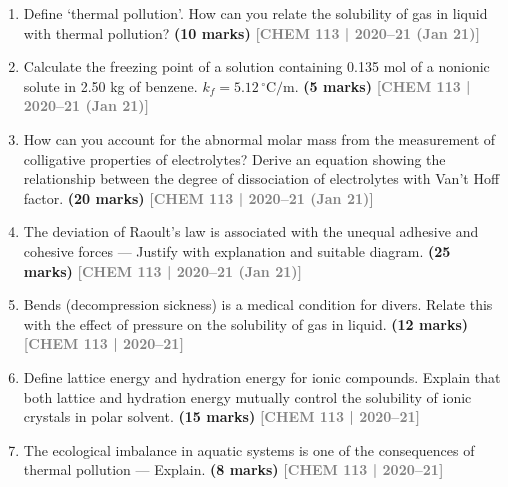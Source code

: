 \documentclass[12pt,a3paper]{article}
\newcommand{\yr}[1]{\hfill\textcolor{gray}{\small\textbf{[#1]}}}
\newcommand{\mk}[1]{\textcolor{orange!70!black}{\small\textbf{(#1 marks)}}}
\begin{document}
\begin{enumerate}
\item Define `thermal pollution'. How can you relate the solubility of gas in liquid with thermal pollution? \mk{10}
\yr{CHEM 113 | 2020--21 (Jan 21)}




\item Calculate the freezing point of a solution containing 0.135 mol of a nonionic solute in 2.50 kg of benzene. $k_f = 5.12\,^\circ\text{C/m}$. \mk{5}
\yr{CHEM 113 | 2020--21 (Jan 21)}




\item How can you account for the abnormal molar mass from the measurement of colligative properties of electrolytes? Derive an equation showing the relationship between the degree of dissociation of electrolytes with Van't Hoff factor. \mk{20}
\yr{CHEM 113 | 2020--21 (Jan 21)}




\item The deviation of Raoult's law is associated with the unequal adhesive and cohesive forces --- Justify with explanation and suitable diagram. \mk{25}
\yr{CHEM 113 | 2020--21 (Jan 21)}




\item Bends (decompression sickness) is a medical condition for divers. Relate this with the effect of pressure on the solubility of gas in liquid. \mk{12}
\yr{CHEM 113 | 2020--21}



\item Define lattice energy and hydration energy for ionic compounds. Explain that both lattice and hydration energy mutually control the solubility of ionic crystals in polar solvent. \mk{15}
\yr{CHEM 113 | 2020--21}



\item The ecological imbalance in aquatic systems is one of the consequences of thermal pollution --- Explain. \mk{8}
\yr{CHEM 113 | 2020--21}




\end{enumerate}
\end{document}
